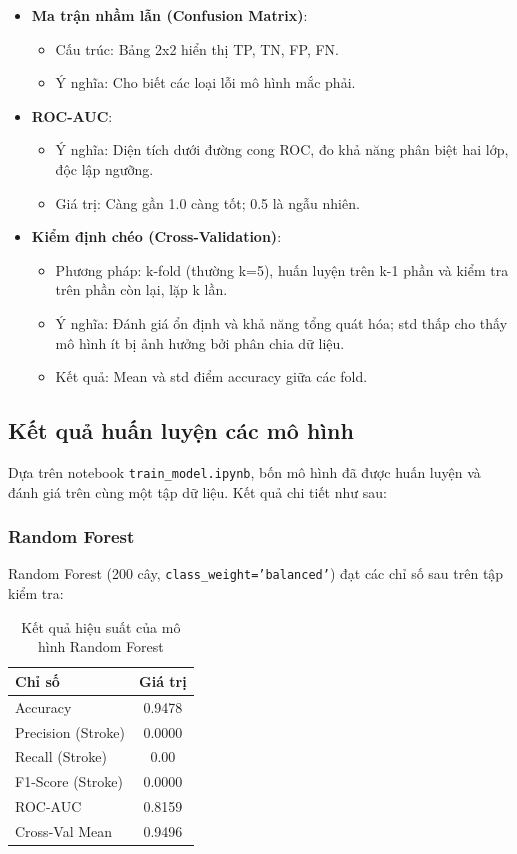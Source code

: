 ﻿\documentclass{article}
\begin{document}
\begin{itemize}
    \item \textbf{Ma trận nhầm lẫn (Confusion Matrix)}:
    \begin{itemize}
        \item Cấu trúc: Bảng 2x2 hiển thị TP, TN, FP, FN.
        \item Ý nghĩa: Cho biết các loại lỗi mô hình mắc phải.
    \end{itemize}
    
    \item \textbf{ROC-AUC}:
    \begin{itemize}
        \item Ý nghĩa: Diện tích dưới đường cong ROC, đo khả năng phân biệt hai lớp, độc lập ngưỡng.
        \item Giá trị: Càng gần 1.0 càng tốt; 0.5 là ngẫu nhiên.
    \end{itemize}
    
    \item \textbf{Kiểm định chéo (Cross-Validation)}:
    \begin{itemize}
        \item Phương pháp: k-fold (thường k=5), huấn luyện trên k-1 phần và kiểm tra trên phần còn lại, lặp k lần.
        \item Ý nghĩa: Đánh giá ổn định và khả năng tổng quát hóa; std thấp cho thấy mô hình ít bị ảnh hưởng bởi phân chia dữ liệu.
        \item Kết quả: Mean và std điểm accuracy giữa các fold.
    \end{itemize}
\end{itemize}

\subsection{Kết quả huấn luyện các mô hình}
Dựa trên notebook \texttt{train\_model.ipynb}, bốn mô hình đã được huấn luyện và đánh giá trên cùng một tập dữ liệu. Kết quả chi tiết như sau:

\subsubsection{Random Forest}
Random Forest (200 cây, \texttt{class\_weight='balanced'}) đạt các chỉ số sau trên tập kiểm tra:

\begin{table}[h]
\centering
\begin{tabular}{|l|c|}
\hline
\textbf{Chỉ số} & \textbf{Giá trị} \\
\hline
Accuracy & 0.9478 \\
Precision (Stroke) & 0.0000 \\
Recall (Stroke) & 0.00 \\
F1-Score (Stroke) & 0.0000 \\
ROC-AUC & 0.8159 \\
Cross-Val Mean & 0.9496 \\
\hline
\end{tabular}
\caption{Kết quả hiệu suất của mô hình Random Forest}
\label{tab:rf_performance}
\end{table}
\end{document}

